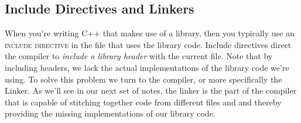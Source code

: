 \documentclass[]{tufte-handout}
\begin{document}
\subsection{Include Directives and Linkers}

When you're writing C++ that makes use of a library, then you typically use an \textsc{include directive} in the file that uses the library code.  Include directives direct the compiler to \textit{include a library header} with the current file. Note that by including headers, we lack the actual implementations of the library code we're using.  To solve this problem we turn to the compiler, or more specifically the Linker.  As we'll see in our next set of notes, the linker is the part of the compiler that is capable of stitching together code from different files and and thereby providing the missing implementations of our library code.  
 
\end{document}
